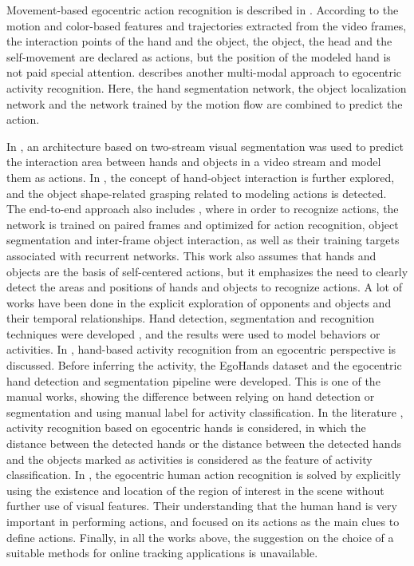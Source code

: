 Movement-based egocentric action recognition is described in \cite{7298625}. According to the motion and color-based features and trajectories extracted from the video frames, the interaction points of the hand and the object, the object, the head and the self-movement are declared as actions, but the position of the modeled hand is not paid special attention. \cite{7780578} describes another multi-modal approach to egocentric activity recognition. Here, the hand segmentation network, the object localization network and the network trained by the motion flow are combined to predict the action.

In \cite{DBLP:journals/corr/BertasiusPYS16}, an architecture based on two-stream visual segmentation was used to predict the interaction area between hands and objects in a video stream and model them as actions. In \cite{cai2016understanding}, the concept of hand-object interaction is further explored, and the object shape-related grasping related to modeling actions is detected. The end-to-end approach also includes \cite{DBLP:journals/corr/abs-1806-06157}, where in order to recognize actions, the network is trained on paired frames and optimized for action recognition, object segmentation and inter-frame object interaction, as well as their training targets associated with recurrent networks. This work also assumes that hands and objects are the basis of self-centered actions, but it emphasizes the need to clearly detect the areas and positions of hands and objects to recognize actions.
A lot of works have been done in the explicit exploration of opponents and objects and their temporal relationships. Hand detection, segmentation and recognition techniques were developed \cite{6619302} \cite{6910041} \cite{10.1016/j.cviu.2016.09.005}, and the results were used to model behaviors or activities. In \cite{7410583}, hand-based activity recognition from an egocentric perspective is discussed. Before inferring the activity, the EgoHands dataset and the egocentric hand detection and segmentation pipeline were developed. This is one of the manual works, showing the difference between relying on hand detection or segmentation and using manual label for activity classification. In the literature \cite{Recognition}, activity recognition based on egocentric hands is considered, in which the distance between the detected hands or the distance between the detected hands and the objects marked as activities is considered as the feature of activity classification.
In \cite{9060114}, the egocentric human action recognition is solved by explicitly using the existence and location of the region of interest in the scene without further use of visual features. Their understanding that the human hand is very important in performing actions, and focused on its actions as the main clues to define actions. Finally, in all the works above, the suggestion on the choice of a suitable methods for online tracking applications is unavailable.
